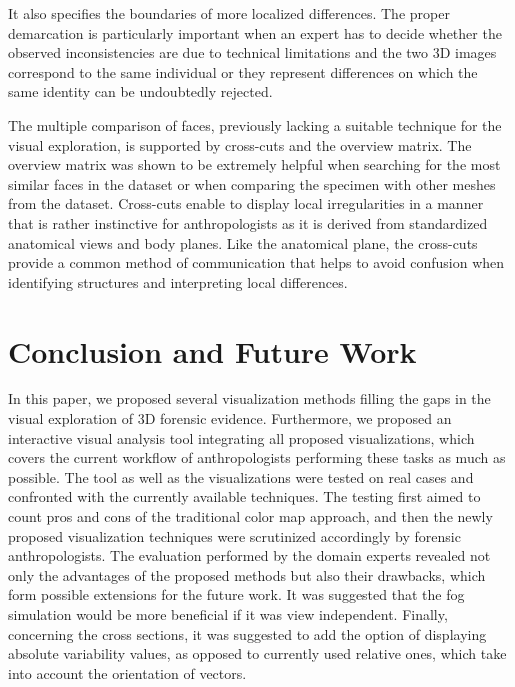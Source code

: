 \documentclass[final,5p,times]{elsarticle}
\begin{document}
It also specifies the boundaries of more localized differences. 
The proper demarcation is particularly important when an expert has to decide whether the observed inconsistencies are due to technical limitations and the two 3D images correspond to the same individual or they represent differences on which the same identity can be undoubtedly rejected. 
 
The multiple comparison of faces, previously lacking a suitable technique for the visual exploration, is supported by cross-cuts and the overview matrix. 
The overview matrix was shown to be extremely helpful when searching for the most similar faces in the dataset or when comparing the specimen with other meshes from the dataset. 
Cross-cuts enable to display local irregularities in a manner that is rather instinctive for anthropologists as it is derived from standardized anatomical views and body planes. 
Like the anatomical plane, the cross-cuts provide a common method of communication that helps to avoid confusion when identifying structures and interpreting local differences.

\section{Conclusion and Future Work} \label{conclusion}
In this paper, we proposed several visualization methods filling the gaps in the visual exploration of 3D forensic evidence.
Furthermore, we proposed an interactive visual analysis tool integrating all proposed visualizations, which covers the current workflow of anthropologists performing these tasks as much as possible.
The tool as well as the visualizations were tested on real cases and confronted with the currently available techniques. 
The testing first aimed to count pros and cons of the traditional color map approach, and then the newly proposed visualization techniques were scrutinized accordingly by forensic anthropologists. 
The evaluation performed by the domain experts revealed not only the advantages of the proposed methods but also their drawbacks, which form possible extensions for the future work. 
It was suggested that the fog simulation would be more beneficial if it was view independent. 
Finally, concerning the cross sections, it was suggested to add the option of displaying absolute variability values, as opposed to currently used relative ones, which take into account the orientation of vectors.
\end{document}
